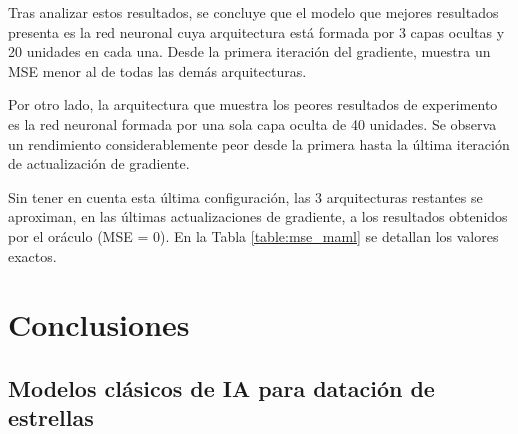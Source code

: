 Tras analizar estos resultados, se concluye que el modelo que mejores resultados presenta es la red neuronal cuya arquitectura está formada por 3 capas ocultas y 20 unidades en cada una. Desde la primera iteración del gradiente, muestra un MSE menor al de todas las demás arquitecturas.

Por otro lado, la arquitectura que muestra los peores resultados de experimento es la red neuronal formada por una sola capa oculta de 40 unidades. Se observa un rendimiento considerablemente peor %
desde la primera hasta la última iteración de actualización de gradiente.

Sin tener en cuenta esta última configuración, las 3 arquitecturas restantes se aproximan, en las últimas actualizaciones de gradiente, a los resultados obtenidos por el oráculo (MSE = 0). En la Tabla \ref{table:mse_maml} se detallan los valores exactos.

\begin{table}[H]
\centering
{}%
\caption{MSE para las diferentes arquitucturas y cada una de las actualizaciones de gradiente.}\label{table:mse_maml}
\end{table}


\chapter{Conclusiones}

\section{Modelos clásicos de IA para datación de estrellas}

